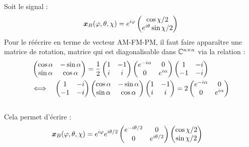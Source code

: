 \begin{annexe}
Soit le signal :
\[\boldsymbol{x}_B(\varphi, \theta, \chi) = e^{i\varphi} \begin{pmatrix}
	\cos \chi/2 \\ e^{i\theta}\sin\chi/2\end{pmatrix}\]
Pour le réécrire en terme de vecteur AM-FM-PM, il faut faire apparaître une matrice de rotation, matrice qui est diagonalisable dans $\mathbb{C}^{n\times n}$ via la relation :
\begin{align*}
	&\begin{pmatrix} 
		\cos \alpha & -\sin \alpha \\ 
		\sin\alpha & \cos\alpha 
	\end{pmatrix} = \frac{1}{2} \begin{pmatrix} 
		1 & -1 \\ i & i
	\end{pmatrix}\begin{pmatrix} 
		e^{-i\alpha} & 0 \\ 
		0 & e^{i\alpha} 
	\end{pmatrix}\begin{pmatrix} 
		1 & -i \\ -1 & -i
	\end{pmatrix}\\
	&\Longleftrightarrow\quad \begin{pmatrix} 
		1 & -i \\ -1 & -i
	\end{pmatrix}\begin{pmatrix} 
		\cos \alpha & -\sin \alpha \\ 
		\sin\alpha & \cos\alpha 
	\end{pmatrix} \begin{pmatrix} 
		1 & -1 \\ i & i
	\end{pmatrix} = 2 \begin{pmatrix} 
		e^{-i\alpha} & 0 \\ 
		0 & e^{i\alpha} 
	\end{pmatrix}
\end{align*}
\\
Cela permet d'écrire :
\begin{align*}
	\boldsymbol{x}_B(\varphi, \theta, \chi) &= e^{i\varphi} e^{i\theta/2}\begin{pmatrix}
			e^{-i\theta/2} & 0 \\
			0 & e^{i\theta/2}
		\end{pmatrix}\begin{pmatrix} 
			\cos \chi/2 \\ 
			\sin \chi/2 

\end{pmatrix}
\end{align*}
\end{annexe}
